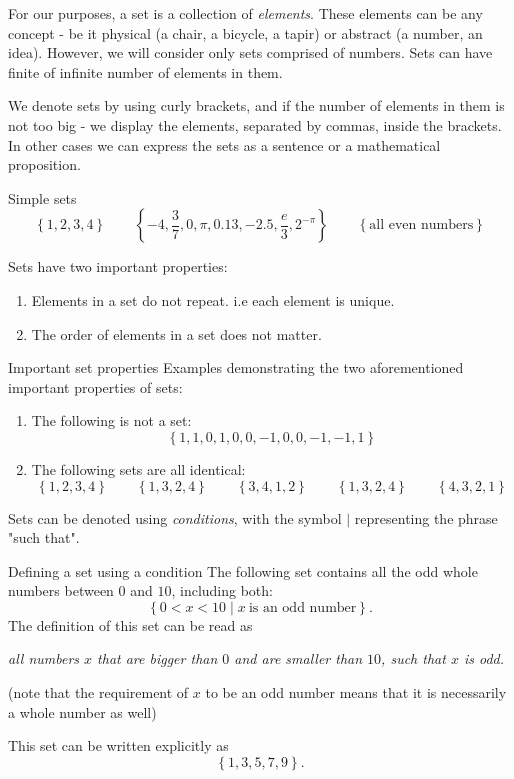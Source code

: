 For our purposes, a set is a collection of \emph{elements}. These elements can be any concept - be it physical (a chair, a bicycle, a tapir) or abstract (a number, an idea). However, we will consider only sets comprised of numbers. Sets can have finite of infinite number of elements in them.

We denote sets by using curly brackets, and if the number of elements in them is not too big - we display the elements, separated by commas, inside the brackets. In other cases we can express the sets as a sentence or a mathematical proposition.

\begin{example}{Simple sets}{}
	\[
		\left\{ 1,2,3,4 \right\}\qquad\left\{ -4,\frac{3}{7},0,\pi,0.13,-2.5,\frac{e}{3},2^{-\pi} \right\}\qquad\left\{ \text{all even numbers} \right\}
	\]
\end{example}

Sets have two important properties:
\begin{enumerate}
	\item Elements in a set do not repeat. i.e each element is unique. 
	\item The order of elements in a set does not matter.
\end{enumerate}

\begin{example}{Important set properties}{}
	Examples demonstrating the two aforementioned important properties of sets:
	\begin{enumerate}
		\item The following is not a set:
		\[
			\left\{ 1,1,0,1,0,0,-1,0,0,-1,-1,1 \right\}
	\]

		\item The following sets are all identical:
		\[
			\left\{ 1,2,3,4 \right\}\qquad\left\{ 1,3,2,4  \right\}\qquad\left\{ 3,4,1,2 \right\}\qquad\left\{ 1,3,2,4 \right\}\qquad\left\{ 4,3,2,1 \right\}
		\]
	\end{enumerate}
	
\end{example}

Sets can be denoted using \emph{conditions}, with the symbol $|$ representing the phrase "such that".

\begin{example}{Defining a set using a condition}
	The following set contains all the odd whole numbers between $0$ and $10$, including both:
	\[
		\left\{ 0 < x < 10 \mid x\ \text{is an odd number}\right\}.
	\]
	The definition of this set can be read as

	\vspace{3mm}
	\centering
	\textit{all numbers $x$ that are bigger than $0$ and are smaller than $10$, such that $x$ is odd.}

	\flushleft{}
	(note that the requirement of $x$ to be an odd number means that it is necessarily a whole number as well)

	\vspace{1em}
	This set can be written explicitly as
	\[
		\left\{ 1,3,5,7,9 \right\}.
	\]
\end{example}

